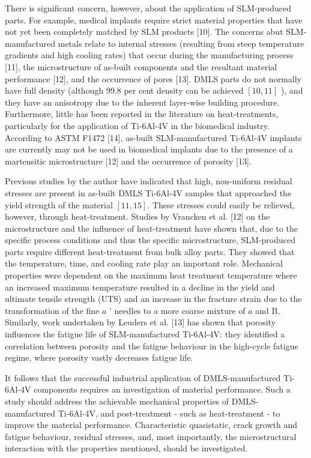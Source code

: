 \documentclass[10pt]{article}
\begin{document}
There is significant concern, however, about the application of SLM-produced parts. For example, medical implants require strict material properties that have not yet been completely matched by SLM products [10]. The concerns abut SLM-manufactured metals relate to internal stresses (resulting from steep temperature gradients and high cooling rates) that occur during the manufacturing process [11], the microstructure of as-built components and the resultant material performance [12], and the occurrence of pores [13]. DMLS parts do not normally have full density (although 99.8 per cent density can be achieved $[10,11]$ ), and they have an anisotropy due to the inherent layer-wise building procedure. Furthermore, little has been reported in the literature on heat-treatments, particularly for the application of Ti-6Al-4V in the biomedical industry. According to ASTM F1472 [14], as-built SLM-manufactured Ti-6Al-4V implants are currently may not be used in biomedical implants due to the presence of a martensitic microstructure [12] and the occurrence of porosity [13].

Previous studies by the author have indicated that high, non-uniform residual stresses are present in as-built DMLS Ti-6Al-4V samples that approached the yield strength of the material $[11,15]$. These stresses could easily be relieved, however, through heat-treatment. Studies by Vrancken et al. [12] on the microstructure and the influence of heat-treatment have shown that, due to the specific process conditions and thus the specific microstructure, SLM-produced parts require different heat-treatment from bulk alloy parts. They showed that the temperature, time, and cooling rate play an important role. Mechanical properties were dependent on the maximum heat treatment temperature where an increased maximum temperature resulted in a decline in the yield and ultimate tensile strength (UTS) and an increase in the fracture strain due to the transformation of the fine $a$ ' needles to a more coarse mixture of $a$ and B. Similarly, work undertaken by Leuders et al. [13] has shown that porosity influences the fatigue life of SLM-manufactured Ti-6Al-4V: they identified a correlation between porosity and the fatigue behaviour in the high-cycle fatigue regime, where porosity vastly decreases fatigue life.

It follows that the successful industrial application of DMLS-manufactured Ti-6Al-4V components requires an investigation of material performance. Such a study should address the achievable mechanical properties of DMLS-manufactured Ti-6Al-4V, and post-treatment - such as heat-treatment - to improve the material performance. Characteristic quasistatic, crack growth and fatigue behaviour, residual stresses, and, most importantly, the microstructural interaction with the properties mentioned, should be investigated.
\end{document}
